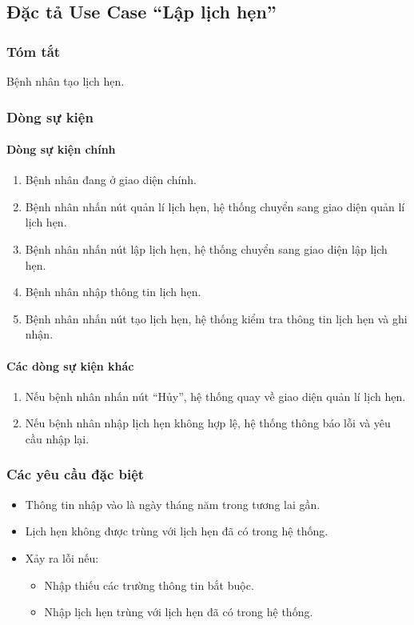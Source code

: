 \subsection{Đặc tả Use Case ``Lập lịch hẹn''}

\subsubsection{Tóm tắt}
Bệnh nhân tạo lịch hẹn.

\subsubsection{Dòng sự kiện}
\paragraph{\textbf{Dòng sự kiện chính}}
\begin{enumerate}
  \item Bệnh nhân đang ở giao diện chính.
  \item Bệnh nhân nhấn nút quản lí lịch hẹn, hệ thống chuyển sang giao diện quản lí lịch hẹn.
  \item Bệnh nhân nhấn nút lập lịch hẹn, hệ thống chuyển sang giao diện lập lịch hẹn.
  \item Bệnh nhân nhập thông tin lịch hẹn.
  \item Bệnh nhân nhấn nút tạo lịch hẹn, hệ thống kiểm tra thông tin lịch hẹn và ghi nhận.
\end{enumerate}

\paragraph{\textbf{Các dòng sự kiện khác}}
\begin{enumerate}
  \item Nếu bệnh nhân nhấn nút ``Hủy'', hệ thống quay về giao diện quản lí lịch hẹn.
  \item Nếu bệnh nhân nhập lịch hẹn không hợp lệ, hệ thống thông báo lỗi và yêu cầu nhập lại.
\end{enumerate}

\subsubsection{Các yêu cầu đặc biệt}
\begin{itemize}
  \item Thông tin nhập vào là ngày tháng năm trong tương lai gần.
  \item Lịch hẹn không được trùng với lịch hẹn đã có trong hệ thống.
  \item Xảy ra lỗi nếu:
  \begin{itemize}
    \item Nhập thiếu các trường thông tin bắt buộc.
    \item Nhập lịch hẹn trùng với lịch hẹn đã có trong hệ thống.
  \end{itemize}
\end{itemize}

